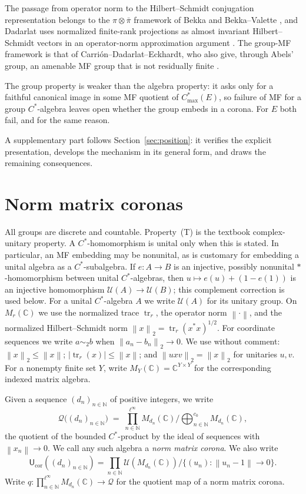 \documentclass[11pt]{amsart}
\theoremstyle{definition}
\theoremstyle{remark}
\theoremstyle{plain}
\newcommand{\C}{\mathbb C}
\newcommand{\N}{\mathbb N}
\newcommand{\U}{\mathcal U}
\newcommand{\Ucor}{\mathsf U_{\mathrm{cor}}}
\newcommand{\tr}{\operatorname{tr}}
\newcommand{\Cmax}{C^*_{\mathrm{max}}}
\newcommand{\opnorm}[1]{\left\lVert #1\right\rVert}
\newcommand{\hsnorm}[1]{\left\lVert #1\right\rVert_{2}}
\begin{document}
The passage from operator norm to the Hilbert--Schmidt conjugation
representation belongs to the $\pi\otimes\bar\pi$ framework of Bekka
and Bekka--Valette \cite{BekkaAmenable,BekkaValette}, and Dadarlat uses
normalized finite-rank projections as almost invariant
Hilbert--Schmidt vectors in an operator-norm approximation argument
\cite[Lemma~3.18 and Proposition~3.19]{Dadarlat}.  The group-MF
framework is that of Carri\'on--Dadarlat--Eckhardt, who also give,
through Abels' group, an amenable MF group that is not residually
finite \cite[Section~2.14 and Corollary~2.18]{CDE}.

The group property is weaker than the algebra property: it asks only for
a faithful canonical image in some MF quotient of $\Cmax(E)$, so failure
of MF for a group $C^*$-algebra leaves open whether the group embeds in
a corona.  For $E$ both fail, and for the same reason.

A supplementary part follows Section~\ref{sec:position}: it verifies
the explicit presentation, develops the mechanism in its general form,
and draws the remaining consequences.

\section{Norm matrix coronas}\label{sec:prelim}

All groups are discrete and countable.  Property~\textup{(T)} is the
textbook complex-unitary property.  A $C^*$-homomorphism is unital only when
this is stated.  In particular, an MF embedding may be nonunital, as is
customary for embedding a unital algebra as a $C^*$-subalgebra.  If
$e\colon A\to B$ is an injective, possibly nonunital $*$-homomorphism between
unital $C^*$-algebras, then $u\mapsto e(u)+(1-e(1))$ is an injective
homomorphism $\U(A)\to\U(B)$; this complement correction is used below.  For
a unital $C^*$-algebra $A$
we write $\U(A)$ for its unitary group.  On $M_r(\C)$ we use the
normalized trace $\tr_r$, the operator norm $\opnorm{\cdot}$, and the
normalized Hilbert--Schmidt norm
$\hsnorm{x}=\tr_r(x^*x)^{1/2}$.  For coordinate sequences we write
$a\sim_2 b$ when $\hsnorm{a_n-b_n}\to0$.  We use without comment:
$\hsnorm{x}\le\opnorm{x}$;
$|\tr_r(x)|\le\opnorm{x}$; and $\hsnorm{uxv}=\hsnorm{x}$ for unitaries
$u,v$.  For a nonempty finite set $Y$, write
$M_Y(\C)=\C^{Y\times Y}$ for the corresponding indexed matrix algebra.

Given a sequence $(d_n)_{n\in\N}$ of positive integers, we write
\[
  \mathcal Q\bigl((d_n)_{n\in\N}\bigr)
  \;=\;\prod_{n\in\N}^{\ell^\infty} M_{d_n}(\C)
  \Big/\bigoplus_{n\in\N}^{c_0} M_{d_n}(\C),
\]
the quotient of the bounded $C^*$-product by the ideal of sequences with
$\opnorm{x_n}\to0$.  We call any such algebra a \emph{norm matrix
corona}.  We also write
\[
 \Ucor((d_n)_{n\in\N})
 =\prod_{n\in\N}\U(M_{d_n}(\C))\Big/
 \bigl\{(u_n):\opnorm{u_n-1}\longrightarrow0\bigr\}.
\]
Write $q\colon\prod_{n\in\N}^{\ell^\infty}M_{d_n}(\C)\to\mathcal Q$
for the quotient map of a norm matrix corona.
\end{document}
